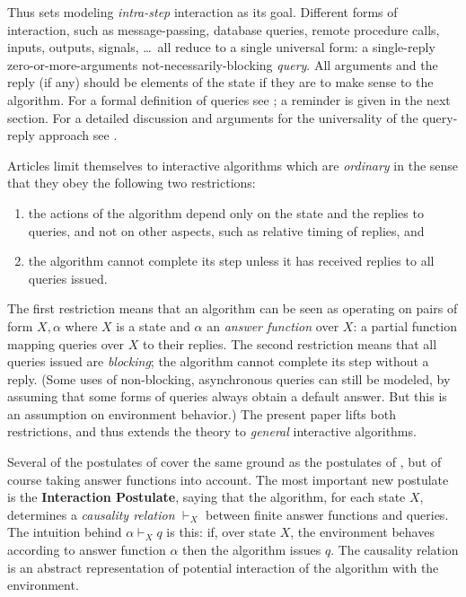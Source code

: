 \documentclass{LMCS}
\theoremstyle{definition}
\begin{document}
Thus \cite{oa1} sets modeling \emph{intra-step} interaction as its
goal. Different forms of interaction, such as message-passing, database
queries, remote procedure calls, inputs, outputs, signals, \ldots\ all
reduce to a single universal form: a single-reply zero-or-more-arguments
not-necessarily-blocking \emph{query}.  All arguments and the reply (if
any) should be elements of the state if they are to make sense to the
algorithm.  For a formal definition of queries see \cite{oa1}; a reminder
is given in the next section.  For a detailed discussion and arguments for
the universality of the query-reply approach see \cite{oa1}.

Articles \cite{oa1,oa2,oa3} limit themselves to interactive algorithms
which are \emph{ordinary} in the sense that they obey the following two
restrictions:
\begin{enumerate}
\item the actions of the algorithm depend only on the state and the
  replies to queries, and not on other aspects, such as relative
  timing of replies, and
\item the algorithm cannot complete its step unless it has received
replies to all queries issued.
\end{enumerate}
The first restriction means that an algorithm can be seen as operating
on pairs of form $X,\alpha$ where $X$ is a state and $\alpha$ an
\emph{answer function} over $X$: a partial function mapping queries
over $X$ to their replies. The second restriction means that all
queries issued are \emph{blocking}; the algorithm cannot complete its
step without a reply. (Some uses of non-blocking, asynchronous queries
can still be modeled, by assuming that some forms of queries always
obtain a default answer. But this is an assumption on environment
behavior.)  The present paper lifts both restrictions, and thus
extends the theory to \emph{general} interactive algorithms.

Several of the postulates of \cite{oa1} cover the same ground as the
postulates of \cite{seqth}, but of course taking answer functions into
account.  The most important new postulate is the \textbf{Interaction
  Postulate}, saying that the algorithm, for each state $X$,
determines a \emph{causality relation} $\vdash_X$ between finite
answer functions and queries.  The intuition behind $\alpha \vdash_X
q$ is this: if, over state $X$, the environment behaves according to
answer function $\alpha$ then the algorithm issues $q$.  The causality
relation is an abstract representation of potential interaction of the
algorithm with the environment.
\end{document}
